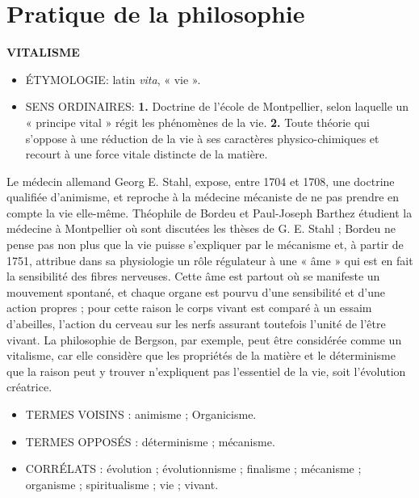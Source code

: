 
\section{Pratique de la philosophie}

{\bf VITALISME}

\begin{itemize}[leftmargin=1cm, label=, itemsep=1pt]
\item {\footnotesize ÉTYMOLOGIE}: latin {\it vita}, « vie ».
\item {\footnotesize SENS ORDINAIRES}: {\bf 1.}  Doctrine de
l'école de Montpellier, selon
laquelle un « principe vital » régit les
phénomènes de la vie. {\bf 2.} Toute
théorie qui s'oppose à une réduction de la vie à ses caractères physico-chimiques et recourt à une
force vitale distincte de la matière.
\end{itemize}

Le médecin allemand Georg E. Stahl,
expose, entre 1704 et 1708, une doctrine
qualifiée d’animisme, et reproche à la
médecine mécaniste de ne pas prendre
en compte la vie elle-même. Théophile
de Bordeu et Paul-Joseph Barthez étudient la médecine à Montpellier où sont
discutées les thèses de G. E. Stahl ; Bordeu ne pense pas non plus que la vie
puisse s'expliquer par le mécanisme et, à
partir de 1751, attribue dans sa physiologie un rôle régulateur à une « âme » qui
est en fait la sensibilité des fibres nerveuses. Cette âme est partout où se manifeste un mouvement spontané, et chaque
organe est pourvu d'une sensibilité et
d'une action propres ; pour cette raison le
corps vivant est comparé à un essaim
d’abeilles, l’action du cerveau sur les nerfs
assurant toutefois l'unité de l'être vivant.
La philosophie de Bergson, par
exemple, peut être considérée comme
un vitalisme, car elle considère que les
propriétés de la matière et le déterminisme que la raison peut y trouver
n'expliquent pas l'essentiel de la vie, soit
l'évolution créatrice.

\begin{itemize}[leftmargin=1cm, label=, itemsep=1pt]
\item {\footnotesize TERMES VOISINS} : animisme ; Organicisme.
\item {\footnotesize TERMES OPPOSÉS} : déterminisme ; mécanisme.
\item {\footnotesize CORRÉLATS} : évolution ; évolutionnisme ;
finalisme ; mécanisme ; organisme ;
spiritualisme ; vie ; vivant.
\end{itemize}

